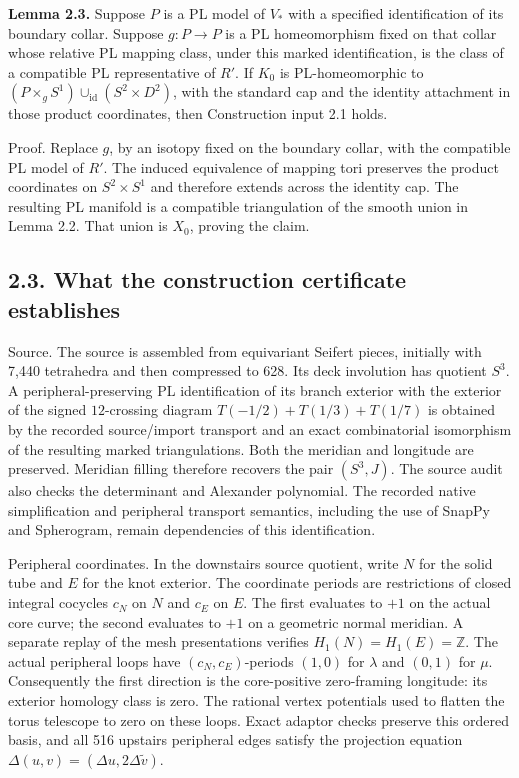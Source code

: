 \documentclass[11pt,letterpaper]{article}
\begin{document}
\medskip\noindent\textbf{Lemma 2.3.} Suppose $P$ is a PL model of $V_*$ with a specified identification of its boundary collar. Suppose $g:P\to P$ is a PL homeomorphism fixed on that collar whose relative PL mapping class, under this marked identification, is the class of a compatible PL representative of $R'$. If $K_0$ is PL-homeomorphic to $(P\times_g S^1)\cup_{\mathrm{id}}(S^2\times D^2)$, with the standard cap and the identity attachment in those product coordinates, then Construction input 2.1 holds.

Proof. Replace $g$, by an isotopy fixed on the boundary collar, with the compatible PL model of $R'$. The induced equivalence of mapping tori preserves the product coordinates on $S^2\times S^1$ and therefore extends across the identity cap. The resulting PL manifold is a compatible triangulation of the smooth union in Lemma 2.2. That union is $X_0$, proving the claim.

\subsection*{2.3. What the construction certificate establishes}
Source. The source is assembled from equivariant Seifert pieces, initially with 7,440 tetrahedra and then compressed to 628. Its deck involution has quotient $S^3$. A peripheral-preserving PL identification of its branch exterior with the exterior of the signed $12$-crossing diagram $T(-1/2)+T(1/3)+T(1/7)$ is obtained by the recorded source/import transport and an exact combinatorial isomorphism of the resulting marked triangulations. Both the meridian and longitude are preserved. Meridian filling therefore recovers the pair $(S^3,J)$. The source audit also checks the determinant and Alexander polynomial. The recorded native simplification and peripheral transport semantics, including the use of SnapPy and Spherogram, remain dependencies of this identification.

Peripheral coordinates. In the downstairs source quotient, write $N$ for the solid tube and $E$ for the knot exterior. The coordinate periods are restrictions of closed integral cocycles $c_N$ on $N$ and $c_E$ on $E$. The first evaluates to $+1$ on the actual core curve; the second evaluates to $+1$ on a geometric normal meridian. A separate replay of the mesh presentations verifies $H_1(N)=H_1(E)=\mathbb{Z}$. The actual peripheral loops have $(c_N,c_E)$-periods $(1,0)$ for $\lambda$ and $(0,1)$ for $\mu$. Consequently the first direction is the core-positive zero-framing longitude: its exterior homology class is zero. The rational vertex potentials used to flatten the torus telescope to zero on these loops. Exact adaptor checks preserve this ordered basis, and all 516 upstairs peripheral edges satisfy the projection equation $\Delta(u,v)=(\Delta u,2\Delta\widetilde v)$.
\end{document}
